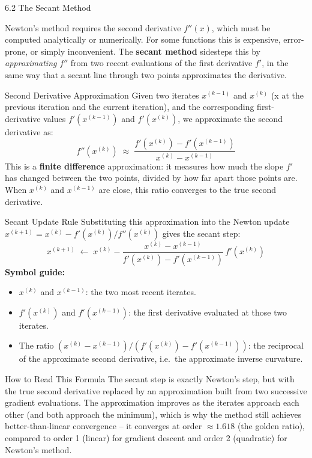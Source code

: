 \documentclass[aspectratio=169,10pt]{beamer}
\begin{document}
\begin{frame}[allowframebreaks]{6.2 The Secant Method}

  Newton's method requires the second derivative $f''(x)$, which must be computed
  analytically or numerically.  For some functions this is expensive, error-prone,
  or simply inconvenient.  The \textbf{secant method} sidesteps this by
  \emph{approximating} $f''$ from two recent evaluations of the first derivative
  $f'$, in the same way that a secant line through two points approximates the
  derivative.

  \begin{block}{Second Derivative Approximation}
    Given two iterates $x^{(k-1)}$ and $x^{(k)}$ (x at the previous iteration
    and the current iteration), and the corresponding first-derivative values
    $f'(x^{(k-1)})$ and $f'(x^{(k)})$, we approximate the second derivative as:
    \[
      f''\!\left(x^{(k)}\right)
      \;\approx\;
      \frac{f'\!\left(x^{(k)}\right) - f'\!\left(x^{(k-1)}\right)}
           {x^{(k)} - x^{(k-1)}}
    \]
    This is a \textbf{finite difference} approximation: it measures how much the
    slope $f'$ has changed between the two points, divided by how far apart those
    points are.  When $x^{(k)}$ and $x^{(k-1)}$ are close, this ratio converges
    to the true second derivative.
  \end{block}

  \begin{block}{Secant Update Rule}
    Substituting this approximation into the Newton update
    $x^{(k+1)} = x^{(k)} - f'(x^{(k)})/f''(x^{(k)})$ gives the secant step:
    \[
      x^{(k+1)} \;\leftarrow\; x^{(k)}
        - \frac{x^{(k)} - x^{(k-1)}}
               {f'\!\left(x^{(k)}\right) - f'\!\left(x^{(k-1)}\right)}
          \, f'\!\left(x^{(k)}\right)
    \]
    \textbf{Symbol guide:}
    \begin{itemize}
      \item $x^{(k)}$ and $x^{(k-1)}$: the two most recent iterates.
      \item $f'(x^{(k)})$ and $f'(x^{(k-1)})$: the first derivative evaluated at
        those two iterates.
      \item The ratio $(x^{(k)} - x^{(k-1)})/(f'(x^{(k)}) - f'(x^{(k-1)}))$: the
        reciprocal of the approximate second derivative, i.e.\ the approximate
        inverse curvature.
    \end{itemize}
  \end{block}

  \begin{alertblock}{How to Read This Formula}
    The secant step is exactly Newton's step, but with the true second derivative
    replaced by an approximation built from two successive gradient evaluations.
    The approximation improves as the iterates approach each other (and both
    approach the minimum), which is why the method still achieves better-than-linear
    convergence -- it converges at order $\approx 1.618$ (the golden ratio),
    compared to order 1 (linear) for gradient descent and order 2 (quadratic) for
    Newton's method.
  \end{alertblock}


\end{frame}
\end{document}
